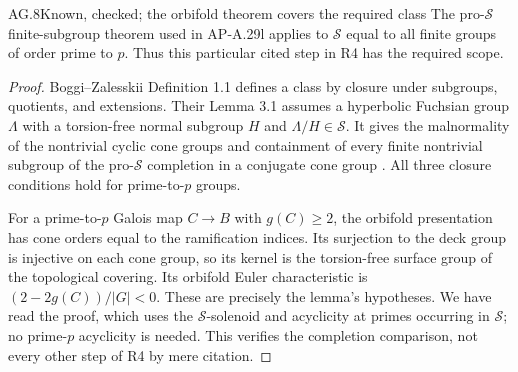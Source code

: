 \begin{claim}{AG.8}{Known, checked; the orbifold theorem covers the required class}
The pro-$\mathscr S$ finite-subgroup theorem used in AP-A.29l
applies to $\mathscr S$ equal to all finite groups of order
prime to $p$. Thus this particular cited step in R4 has the
required scope.
\end{claim}
\begin{proof}
Boggi--Zalesskii Definition 1.1 defines a class by closure under
subgroups, quotients, and extensions. Their Lemma 3.1 assumes
a hyperbolic Fuchsian group $\Lambda$ with a torsion-free
normal subgroup $H$ and $\Lambda/H\in\mathscr S$. It gives
the malnormality of the nontrivial cyclic cone groups and
containment of every finite nontrivial subgroup of the
pro-$\mathscr S$ completion in a conjugate cone group
\cite{AG_BoggiZalesskii2019}. All three closure conditions
hold for prime-to-$p$ groups.

For a prime-to-$p$ Galois map $C\to B$ with $g(C)\ge2$,
the orbifold presentation has cone orders equal to the
ramification indices. Its surjection to the deck group is
injective on each cone group, so its kernel is the
torsion-free surface group of the topological covering.
Its orbifold Euler characteristic is
$(2-2g(C))/|G|<0$. These are precisely the lemma's
hypotheses. We have read the proof, which uses the
$\mathscr S$-solenoid and acyclicity at primes occurring
in $\mathscr S$; no prime-$p$ acyclicity is needed.
This verifies the completion comparison, not every other
step of R4 by mere citation.
\end{proof}

